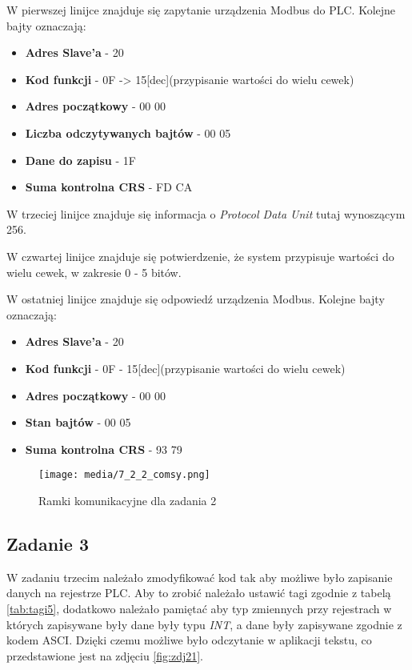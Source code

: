 \documentclass{article}
\begin{document}
W pierwszej linijce znajduje się zapytanie urządzenia Modbus do PLC. Kolejne bajty oznaczają:
\begin{itemize}
    \item \textbf{Adres Slave'a} - 20
    \item \textbf{Kod funkcji} - 0F -> 15[dec](przypisanie wartości do wielu cewek)
    \item \textbf{Adres początkowy} - 00 00
    \item \textbf{Liczba odczytywanych bajtów} - 00 05
    \item \textbf{Dane do zapisu} - 1F
    \item \textbf{Suma kontrolna CRS} - FD CA
\end{itemize}

W trzeciej linijce znajduje się informacja o \textit{Protocol Data Unit} tutaj wynoszącym 256.

W czwartej linijce znajduje się potwierdzenie, że system przypisuje wartości do wielu cewek, w zakresie 0 - 5 bitów.

W ostatniej linijce znajduje się odpowiedź urządzenia Modbus. Kolejne bajty oznaczają:
\begin{itemize}
    \item \textbf{Adres Slave'a} - 20
    \item \textbf{Kod funkcji} - 0F - 15[dec](przypisanie wartości do wielu cewek)
    \item \textbf{Adres początkowy} - 00 00 
    \item \textbf{Stan bajtów} - 00 05
    \item \textbf{Suma kontrolna CRS} - 93 79
\end{itemize}


\begin{figure}[H]
    \centering
    \texttt{[image: media/7\_2\_2\_comsy.png]}
    \caption{Ramki komunikacyjne dla zadania 2}
    \label{fig:zdj20}
\end{figure}

\newpage
\subsection{Zadanie 3}
W zadaniu trzecim należało zmodyfikować kod tak aby możliwe było zapisanie danych na rejestrze PLC. Aby to zrobić należało ustawić tagi zgodnie z tabelą \ref{tab:tagi5}, dodatkowo należało pamiętać aby typ zmiennych przy rejestrach w których zapisywane były dane były typu \textit{INT}, a dane były zapisywane zgodnie z kodem ASCI. Dzięki czemu możliwe było odczytanie w aplikacji tekstu, co przedstawione jest na zdjęciu \ref{fig:zdj21}.
\end{document}
